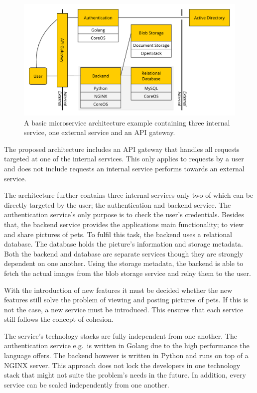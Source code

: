 \begin{figure}[H]
\begin{center}
  \includegraphics[scale=0.7]{images/figures/microservice_example.pdf}
\end{center}
\caption{A basic microservice architecture example containing three internal
service, one external service and an \acs{API} gateway.}
\label{fig:microservice_example}
\end{figure}

The proposed architecture includes an \ac{API} gateway that handles all requests
targeted at one of the internal services. This only applies to requests by a
user and does not include requests an internal service performs towards an
external service.

The architecture further contains three internal services only two of which can
be directly targeted by the user; the authentication and backend service. The
authentication service's only purpose is to check the user's credentials.
Besides that, the backend service provides the applications main functionality;
to view and share pictures of pets. To fulfil this task, the backend uses a
relational database. The database holds the picture's information and storage
metadata. Both the backend and database are separate services though they are
strongly dependent on one another. Using the storage metadata, the backend is
able to fetch the actual images from the blob storage service and relay them to
the user.

With the introduction of new features it must be decided whether the new
features still solve the problem of viewing and posting pictures of pets. If
this is not the case, a new service must be introduced. This ensures that each
service still follows the concept of cohesion.

The service's technology stacks are fully independent from one another. The
authentication service e.g.\ is written in Golang due to the high performance
the language offers. The backend however is written in Python and runs on top
of a NGINX server. This approach does not lock the developers in one technology
stack that might not suite the problem's needs in the future. In addition,
every service can be scaled independently from one another.

